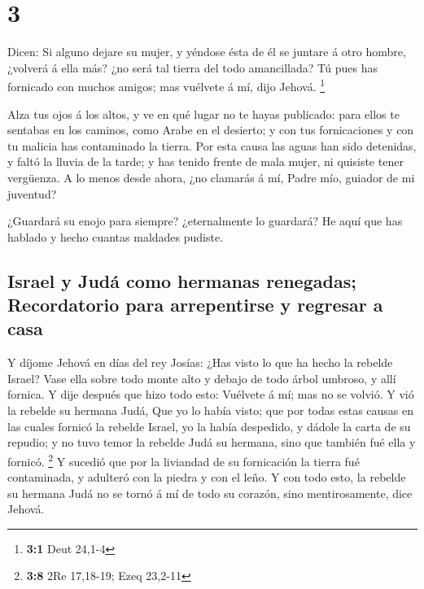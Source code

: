\hypertarget{section-2}{%
\section{3}\label{section-2}}

 Dicen: Si alguno dejare su mujer, y yéndose ésta de él se
juntare á otro hombre, ¿volverá á ella más? ¿no será tal tierra del todo
amancillada? Tú pues has fornicado con muchos amigos; mas vuélvete á mí,
dijo Jehová. \footnote{\textbf{3:1} Deut 24,1-4}

 Alza tus ojos á los altos, y ve en qué lugar no te hayas
publicado: para ellos te sentabas en los caminos, como Arabe en el
desierto; y con tus fornicaciones y con tu malicia has contaminado la
tierra.  Por esta causa las aguas han sido detenidas, y
faltó la lluvia de la tarde; y has tenido frente de mala mujer, ni
quisiste tener vergüenza.  A lo menos desde ahora, ¿no
clamarás á mí, Padre mío, guiador de mi juventud?

 ¿Guardará su enojo para siempre? ¿eternalmente lo
guardará? He aquí que has hablado y hecho cuantas maldades pudiste.

\hypertarget{israel-y-juduxe1-como-hermanas-renegadas-recordatorio-para-arrepentirse-y-regresar-a-casa}{%
\subsection{Israel y Judá como hermanas renegadas; Recordatorio para
arrepentirse y regresar a
casa}\label{israel-y-juduxe1-como-hermanas-renegadas-recordatorio-para-arrepentirse-y-regresar-a-casa}}

 Y díjome Jehová en días del rey Josías: ¿Has visto lo que
ha hecho la rebelde Israel? Vase ella sobre todo monte alto y debajo de
todo árbol umbroso, y allí fornica.  Y dije después que
hizo todo esto: Vuélvete á mí; mas no se volvió. Y vió la rebelde su
hermana Judá,  Que yo lo había visto; que por todas estas
causas en las cuales fornicó la rebelde Israel, yo la había despedido, y
dádole la carta de su repudio; y no tuvo temor la rebelde Judá su
hermana, sino que también fué ella y fornicó. \footnote{\textbf{3:8} 2Re
  17,18-19; Ezeq 23,2-11}  Y sucedió que por la liviandad
de su fornicación la tierra fué contaminada, y adulteró con la piedra y
con el leño.  Y con todo esto, la rebelde su hermana Judá
no se tornó á mí de todo su corazón, sino mentirosamente, dice Jehová.

